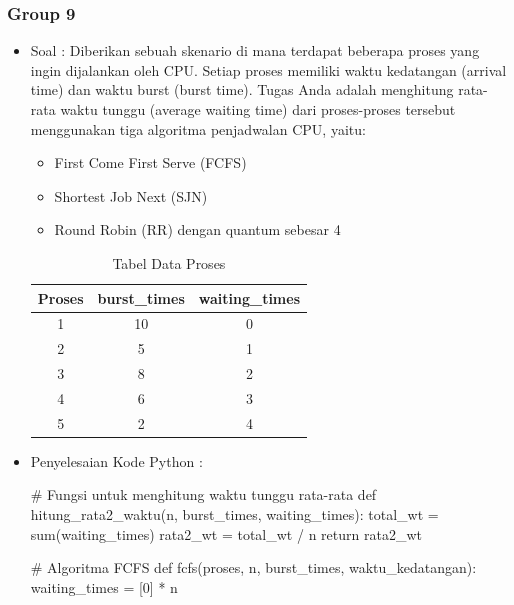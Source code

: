 \documentclass[12pt]{article}
\begin{document}
\subsubsection{Group 9}
\begin{itemize}
    \item Soal : Diberikan sebuah skenario di mana terdapat beberapa proses yang ingin dijalankan oleh CPU. Setiap proses memiliki waktu kedatangan (arrival time) dan waktu burst (burst time). Tugas Anda adalah menghitung rata-rata waktu tunggu (average waiting time) dari proses-proses tersebut menggunakan tiga algoritma penjadwalan CPU, yaitu:
    \begin{itemize}
        \item First Come First Serve (FCFS)
        \item Shortest Job Next (SJN)
        \item Round Robin (RR) dengan quantum sebesar 4
    \end{itemize}
    
    \begin{table}[h!]
    \centering
    \begin{tabular}{|c|c|c|}
        \hline
        \textbf{Proses} & \textbf{burst\_times} & \textbf{waiting\_times} \\ 
        \hline
        1              & 10                   & 0                         \\ 
        \hline
        2              & 5                    & 1                         \\ 
        \hline
        3              & 8                    & 2                         \\ 
        \hline
        4              & 6                    & 3                         \\ 
        \hline
        5              & 2                    & 4                         \\ 
        \hline
        \end{tabular}
        \caption{Tabel Data Proses}
        \label{tabel:proses}
    \end{table}
    \item Penyelesaian Kode Python :
\begin{python}
# Fungsi untuk menghitung waktu tunggu rata-rata
def hitung_rata2_waktu(n, burst_times, waiting_times):
    total_wt = sum(waiting_times)
    rata2_wt = total_wt / n
    return rata2_wt

# Algoritma FCFS
def fcfs(proses, n, burst_times, waktu_kedatangan):
    waiting_times = [0] * n


\end{python}
\end{itemize}
\end{document}
